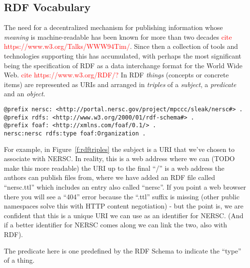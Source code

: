 \subsection{RDF Vocabulary}

The need for a decentralized mechanism for publishing information whose 
\emph{meaning} is machine-readable has been known for more than two decades
\textcolor{red}{cite https://www.w3.org/Talks/WWW94Tim/}. Since then a 
collection of tools and technologies supporting this has accumulated, with
perhaps the most significant being the specification of RDF as a data 
interchange format for the World Wide Web. \textcolor{red}{cite https://www.w3.org/RDF/?}
In RDF \emph{things} (concepts or concrete items) are represented as URIs
and arranged in \emph{triples} of a \emph{subject}, a \emph{predicate} and 
an \emph{object}. 

\begin{figure*}
\begin{verbatim}
@prefix nersc: <http://portal.nersc.gov/project/mpccc/sleak/nersc#> .
@prefix rdfs: <http://www.w3.org/2000/01/rdf-schema#> .
@prefix foaf: <http://xmlns.com/foaf/0.1/> .
nersc:nersc rdfs:type foaf:Organization .
\end{verbatim}

\caption{A triple of (subject, predicate, object) describes an edge 
in an RDF graph. The \texttt{Turtle}\textcolor{red}{cite} syntax shown
here aids human readability by condensing URIs into a prefix and a suffix,
so \texttt{rdfs:type} expands as
\texttt{<http://www.w3.org/2000/01/rdf-schema\#type>}.}
\label{f:rdftriples}
\end{figure*}

For example, in Figure~\ref{f:rdftriples} the subject is a URI that 
we've chosen to associate with NERSC. In reality, this is a web address where we can 
(TODO make this more readable)
the URI up to the final ``/'' is a web address the authors
can publish files from, where we have added an RDF file called ``nersc.ttl'' 
which includes an entry also called ``nersc''. If you point a web browser 
there you will see a ``404'' error because the ``.ttl'' suffix is missing 
(other public namespaces solve this with HTTP content negotiation) - but the 
point is, we are confident that this is a unique URI we can use as an 
identifier for NERSC. (And if a better identifier for NERSC comes along 
we can link the two, also with RDF).

The predicate here is one predefined by the RDF Schema to indicate the ``type''
of a thing.

